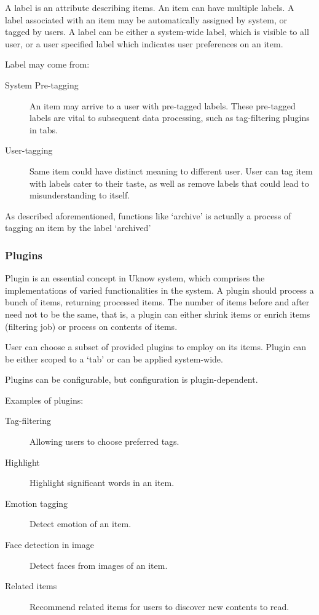 A label is an attribute describing items. An item can have multiple
labels. A label associated with an item may be automatically assigned by
system, or tagged by users. A label can be either a system-wide label,
which is visible to all user, or a user specified label which indicates
user preferences on an item.

Label may come from:

\begin{description}
\item[System Pre-tagging]
  An item may arrive to a user with pre-tagged
  labels. These pre-tagged labels are vital to subsequent data
  processing, such as tag-filtering plugins in tabs.

\item[User-tagging]
  Same item could have distinct meaning to different user.
  User can tag item with labels cater to their taste, as well as remove
  labels that could lead to misunderstanding to itself.
\end{description}

As described aforementioned, functions like `archive' is actually a process of tagging an
item by the label `archived'

\subsubsection{Plugins}

Plugin is an essential concept in Uknow system, which comprises the
implementations of varied functionalities in the system. A plugin should
process a bunch of items, returning processed items. The number of items
before and after need not to be the same, that is, a plugin can either
shrink items or enrich items (filtering job) or process on contents of
items.

User can choose a subset of provided plugins to employ on its items.
Plugin can be either scoped to a `tab' or can be applied system-wide.

Plugins can be configurable, but configuration is plugin-dependent.

Examples of plugins:

\begin{description}
\item[Tag-filtering] Allowing users to choose preferred tags.
\item[Highlight] Highlight significant words in an item.
\item[Emotion tagging] Detect emotion of an item.
\item[Face detection in image] Detect faces from images of an item.
\item[Related items] Recommend related items for users to discover new contents to read.
\end{description}

